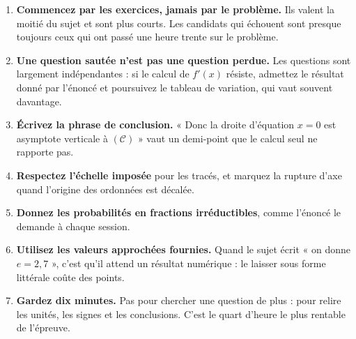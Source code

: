 \begin{enumerate}[label=\textbf{\arabic*.}, leftmargin=*, itemsep=0.25em]
  \item \textbf{Commencez par les exercices, jamais par le problème.} Ils
        valent la moitié du sujet et sont plus courts. Les candidats qui
        échouent sont presque toujours ceux qui ont passé une heure trente
        sur le problème.
  \item \textbf{Une question sautée n'est pas une question perdue.} Les
        questions sont largement indépendantes : si le calcul de $f'(x)$
        résiste, admettez le résultat donné par l'énoncé et poursuivez le
        tableau de variation, qui vaut souvent davantage.
  \item \textbf{Écrivez la phrase de conclusion.} « Donc la droite
        d'équation $x = 0$ est asymptote verticale à $(\mathcal C)$ » vaut
        un demi-point que le calcul seul ne rapporte pas.
  \item \textbf{Respectez l'échelle imposée} pour les tracés, et marquez la
        rupture d'axe quand l'origine des ordonnées est décalée.
  \item \textbf{Donnez les probabilités en fractions irréductibles}, comme
        l'énoncé le demande à chaque session.
  \item \textbf{Utilisez les valeurs approchées fournies.} Quand le sujet
        écrit « on donne $e = 2{,}7$ », c'est qu'il attend un résultat
        numérique : le laisser sous forme littérale coûte des points.
  \item \textbf{Gardez dix minutes.} Pas pour chercher une question de
        plus : pour relire les unités, les signes et les conclusions. C'est
        le quart d'heure le plus rentable de l'épreuve.
\end{enumerate}

